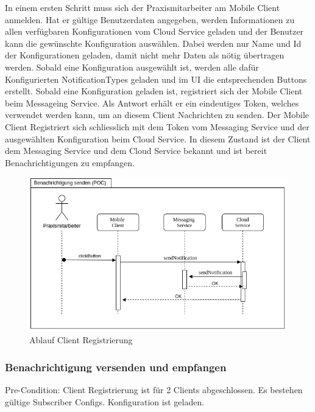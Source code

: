In einem ersten Schritt muss sich der Praxismitarbeiter am Mobile Client anmelden.
Hat er gültige Benutzerdaten angegeben, werden Informationen zu allen verfügbaren Konfigurationen vom Cloud Service geladen und der Benutzer kann die gewünschte Konfiguration auswählen.
Dabei werden nur Name und Id der Konfigurationen geladen, damit nicht mehr Daten als nötig übertragen werden.
Sobald eine Konfiguration ausgewählt ist, werden alle dafür Konfigurierten NotificationTypes geladen und im UI die entsprechenden Buttons erstellt.
Sobald eine Konfiguration geladen ist, registriert sich der Mobile Client beim Messageing Service.
Als Antwort erhält er ein eindeutiges Token, welches verwendet werden kann, um an diesem Client Nachrichten zu senden.
Der Mobile Client Registriert sich schliesslich mit dem Token vom Messaging Service und der ausgewählten Konfiguration beim Cloud Service.
In diesem Zustand ist der Client dem Messaging Service und dem Cloud Service bekannt und ist bereit Benachrichtigungen zu empfangen.

\begin{figure}[h]
    \centering
    \begin{minipage}[b]{1.0\textwidth}
        \includegraphics[width=\textwidth]{graphics/Sequence_POC_Send}
        \caption{Ablauf Client Registrierung}
    \end{minipage}
\end{figure}


\subsubsection*{Benachrichtigung versenden und empfangen}

Pre-Condition: Client Registrierung ist für 2 Clients abgeschlossen. Es bestehen gültige Subscriber Configs. Konfiguration ist geladen.

